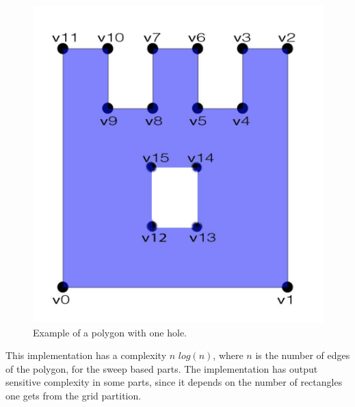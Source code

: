 \documentclass[12pt,a4paper,oneside]{article}
\begin{document}
\begin{figure}[h!]
  \centering \includegraphics[scale=0.2]{first.jpg}
  \caption{Example of a polygon with one hole.}
  \label{fig:hole}
\end{figure}

This implementation has a complexity $n$ $log(n)$, where $n$ is the number of edges of the polygon, for the sweep based parts. The implementation has output sensitive complexity in some parts, since it depends on the number of rectangles one gets from the grid partition.
\end{document}
